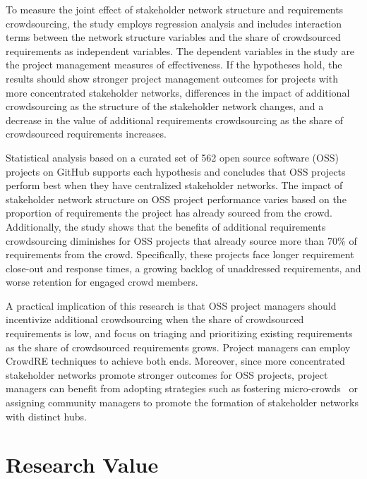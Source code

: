 To measure the joint effect of stakeholder network structure and requirements crowdsourcing, the study employs regression analysis and includes interaction terms between the network structure variables and the share of crowdsourced requirements as independent variables. The dependent variables in the study are the project management measures of effectiveness. If the hypotheses hold, the results should show stronger project management outcomes for projects with more concentrated stakeholder networks, differences in the impact of additional crowdsourcing as the structure of the stakeholder network changes, and a decrease in the value of additional requirements crowdsourcing as the share of crowdsourced requirements increases.

Statistical analysis based on a curated set of 562 open source software (OSS) projects on GitHub supports each hypothesis and concludes that OSS projects perform best when they have centralized stakeholder networks. The impact of stakeholder network structure on OSS project performance varies based on the proportion of requirements the project has already sourced from the crowd. Additionally, the study shows that the benefits of additional requirements crowdsourcing diminishes for OSS projects that already source more than 70\% of requirements from the crowd. Specifically, these projects face longer requirement close-out and response times, a growing backlog of unaddressed requirements, and worse retention for engaged crowd members.

A practical implication of this research is that OSS project managers should incentivize additional crowdsourcing when the share of crowdsourced requirements is low, and focus on triaging and prioritizing existing requirements as the share of crowdsourced requirements grows. Project managers can employ CrowdRE techniques to achieve both ends. Moreover, since more concentrated stakeholder networks promote stronger outcomes for OSS projects, project managers can benefit from adopting strategies such as fostering micro-crowds~\cite{levy} or assigning community managers to promote the formation of stakeholder networks with distinct hubs.

\section{Research Value}

